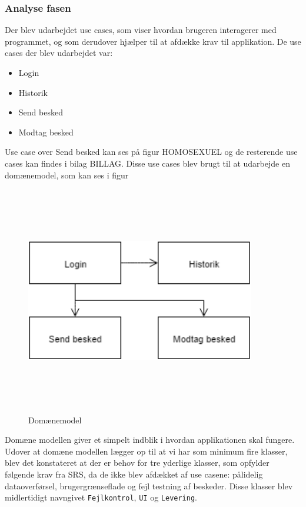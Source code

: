 \subsubsection{Analyse fasen}
Der blev udarbejdet use cases, som viser hvordan brugeren interagerer med programmet, og som derudover hjælper til at afdække krav til applikation.
\newline
De use cases der blev udarbejdet var:
\begin{itemize}
	\item Login
	\item Historik
	\item Send besked
	\item Modtag besked
\end{itemize}
Use case over Send besked kan ses på figur HOMOSEXUEL og de resterende use cases kan findes i bilag BILLAG.
\hfill \break
Disse use cases blev brugt til at udarbejde en domænemodel, som kan ses i figur 
\begin{figure}[ht]
	\centering
	\includegraphics[width=10cm,height=10cm,keepaspectratio]{pictures/Domainmodel.png}
	\caption{Domænemodel}
	\label{fig:dom}
\end{figure}
\newline
Domæne modellen giver et simpelt indblik i hvordan applikationen skal fungere.
\hfill \newline
Udover at domæne modellen lægger op til at vi har som minimum fire klasser, blev det konstateret at der er behov for tre yderlige klasser, som opfylder følgende krav fra SRS, da de ikke blev afdækket af use casene: pålidelig dataoverførsel, brugergrænseflade og fejl testning af beskeder. Disse klasser blev midlertidigt navngivet \texttt{Fejlkontrol}, \texttt{UI} og \texttt{Levering}.

